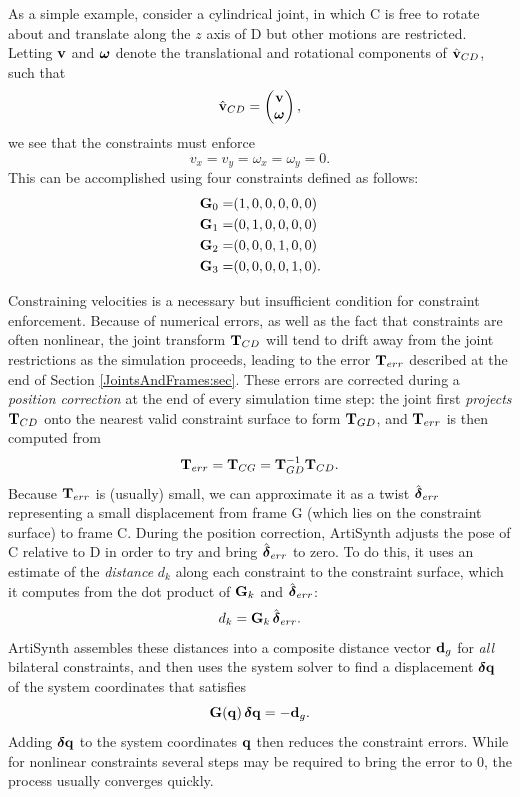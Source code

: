 As a simple example, consider a cylindrical joint, in which C is free
to rotate about and translate along the $z$ axis of D but other
motions are restricted. Letting ${\bf v}$ and $\boldsymbol\omega$ denote the
translational and rotational components of $\hat{{\bf v}}_{CD}$, such that
%
\begin{equation*}
\hat{{\bf v}}_{CD} = \left(\begin{matrix} {\bf v} \\ \boldsymbol\omega \end{matrix}\right),
\end{equation*}
%
we see that the constraints must enforce
%
\begin{equation}
v_x = v_y = \omega_x = \omega_y = 0.
\end{equation}
%
This can be accomplished using four constraints defined as follows:
%
\begin{align*}
{\bf G}_0 = & (1, 0, 0, 0, 0, 0) \\
{\bf G}_1 = & (0, 1, 0, 0, 0, 0) \\
{\bf G}_2 = & (0, 0, 0, 1, 0, 0) \\
{\bf G}_3 = & (0, 0, 0, 0, 1, 0).
\end{align*}
%

Constraining velocities is a necessary but insufficient condition for
constraint enforcement. Because of numerical errors, as well as the
fact that constraints are often nonlinear, the joint transform
${\bf T}_{CD}$ will tend to drift away from the joint restrictions as the
simulation proceeds, leading to the error ${\bf T}_{err}$ described at the
end of Section \ref{JointsAndFrames:sec}. These errors are corrected
during a {\it position correction} at the end of every simulation time
step: the joint first {\it projects} ${\bf T}_{CD}$ onto the nearest valid
constraint surface to form ${\bf T}_{GD}$, and ${\bf T}_{err}$ is then computed from
%
\begin{equation}
{\bf T}_{err} = {\bf T}_{CG} = {\bf T}_{GD}^{-1} {\bf T}_{CD}.
\end{equation}
%
Because ${\bf T}_{err}$ is (usually) small, we can approximate it as
a twist $\hat{\boldsymbol\delta}_{err}$ representing a small displacement from frame
G (which lies on the constraint surface) to frame C. During the
position correction, ArtiSynth adjusts the pose of C relative to D in
order to try and bring $\hat{\boldsymbol\delta}_{err}$ to zero. To do this, it uses
an estimate of the {\it distance} $d_k$ along each constraint to the
constraint surface, which it computes from the dot product of ${\bf G}_k$
and $\hat{\boldsymbol\delta}_{err}$:
%
\begin{equation}
d_k = {\bf G}_k \, \hat{\boldsymbol\delta}_{err}.
\end{equation}
%
ArtiSynth assembles these distances into a composite distance vector
${\bf d}_g$ for {\it all} bilateral constraints, and then uses the system
solver to find a displacement $\boldsymbol\delta {\bf q}$ of the system coordinates
that satisfies
%
\begin{equation*}
{\bf G}({\bf q}) \, \boldsymbol\delta {\bf q} = -{\bf d}_g.
\end{equation*}
%
Adding $\boldsymbol\delta {\bf q}$ to the system coordinates ${\bf q}$ then reduces the
constraint errors. While for nonlinear constraints several steps may be
required to bring the error to 0, the process usually converges
quickly.

